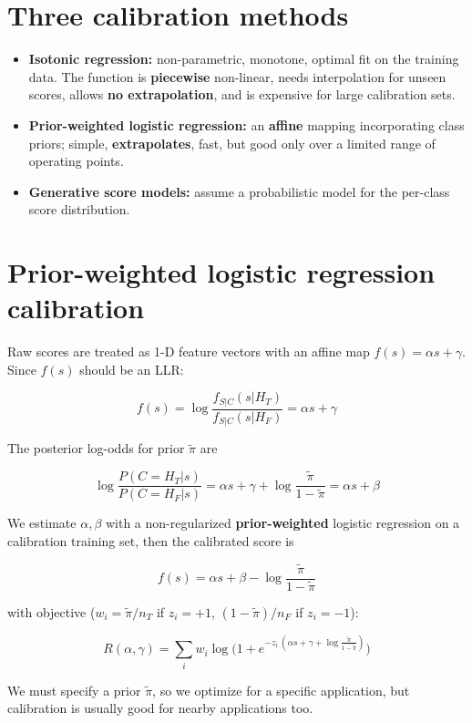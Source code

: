 \section*{Three calibration methods}

\begin{itemize}
\item \textbf{Isotonic regression:} non-parametric, monotone, optimal fit on the training data. The function is \textbf{piecewise} non-linear, needs interpolation for unseen scores, allows \textbf{no extrapolation}, and is expensive for large calibration sets.
\item \textbf{Prior-weighted logistic regression:} an \textbf{affine} mapping incorporating class priors; simple, \textbf{extrapolates}, fast, but good only over a limited range of operating points.
\item \textbf{Generative score models:} assume a probabilistic model for the per-class score distribution.
\end{itemize}

\section*{Prior-weighted logistic regression calibration}

Raw scores are treated as 1-D feature vectors with an affine map $f(s) = \alpha s + \gamma$. Since $f(s)$ should be an LLR:

$$f(s) = \log\frac{f_{S|C}(s|H_T)}{f_{S|C}(s|H_F)} = \alpha s + \gamma$$

The posterior log-odds for prior $\tilde{\pi}$ are

$$\log\frac{P(C=H_T|s)}{P(C=H_F|s)} = \alpha s + \gamma + \log\frac{\tilde{\pi}}{1-\tilde{\pi}} = \alpha s + \beta$$

We estimate $\alpha,\beta$ with a non-regularized \textbf{prior-weighted} logistic regression on a calibration training set, then the calibrated score is

$$f(s) = \alpha s + \beta - \log\frac{\tilde{\pi}}{1-\tilde{\pi}}$$

with objective ($w_i = \tilde{\pi}/n_T$ if $z_i=+1$, $(1-\tilde{\pi})/n_F$ if $z_i=-1$):

$$R(\alpha,\gamma) = \sum_i w_i \log\!\Big(1 + e^{-z_i\,(\alpha s + \gamma + \log\frac{\tilde{\pi}}{1-\tilde{\pi}})}\Big)$$

We must specify a prior $\tilde{\pi}$, so we optimize for a specific application, but calibration is usually good for nearby applications too.

